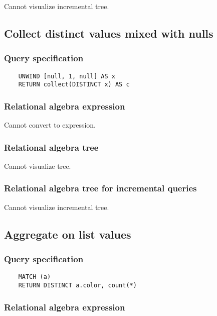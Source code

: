	Cannot visualize incremental tree.
	\subsection{Collect distinct values mixed with nulls}

	\subsubsection*{Query specification}

	\begin{lstlisting}
	UNWIND [null, 1, null] AS x
	RETURN collect(DISTINCT x) AS c
	\end{lstlisting}


	\subsubsection*{Relational algebra expression}

	Cannot convert to expression.

	\subsubsection*{Relational algebra tree}

	Cannot visualize tree.

	\subsubsection*{Relational algebra tree for incremental queries}

	Cannot visualize incremental tree.
	\subsection{Aggregate on list values}

	\subsubsection*{Query specification}

	\begin{lstlisting}
	MATCH (a)
	RETURN DISTINCT a.color, count(*)
	\end{lstlisting}


	\subsubsection*{Relational algebra expression}


